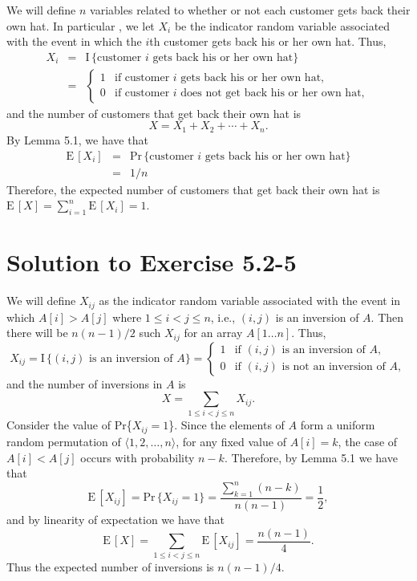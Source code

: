 \documentclass[a4paper, fleqn]{article}
\begin{document}
We will define $n$ variables related to whether or not each customer gets back
their own hat. In particular , we let $X_i$ be the indicator random variable
associated with the event in which the $i$th customer gets back his or her own
hat. Thus,
\begin{eqnarray*}
X_i & = & \mbox{I}\,\{\mbox{customer }i\mbox{ gets back his or her own hat}\} \\
    & = & \left\{\begin{array}{ll}
          1 & \mbox{if customer }i\mbox{ gets back his or her own hat}, \\
          0 & \mbox{if customer }i\mbox{ does not get back his or her own hat},
          \end{array}\right.
\end{eqnarray*}
and the number of customers that get back their own hat is
\[
X = X_1 + X_2 + \cdots + X_n.
\]
By Lemma 5.1, we have that
\begin{eqnarray*}
\mbox{E}\,[X_i] & = & \mbox{Pr}\,\{\mbox{customer } i
                      \mbox{ gets back his or her own hat}\} \\
                & = & 1/n
\end{eqnarray*}
Therefore, the expected number of customers that get back their own hat is
$\mbox{E}\,[X] = \sum_{i = 1}^n \mbox{E}\,[X_i] = 1$.






\section*{Solution to Exercise 5.2-5}

We will define $X_{ij}$ as the indicator random variable associated with the
event in which $A[i] > A[j]$ where $1 \le i < j \le n$, i.e., $(i,j)$ is an
inversion of $A$. Then there will be $n(n - 1)/2$ such $X_{ij}$ for an array
$A[1 \ldots n]$. Thus,
\[
X_{ij} = \mbox{I}\,\{(i,j) \mbox{ is an inversion of } A\} =
         \left\{\begin{array}{ll}
         1 & \mbox{if } (i,j) \mbox{ is an inversion of } A, \\
         0 & \mbox{if } (i,j) \mbox{ is not an inversion of } A,
         \end{array}\right.
\]
and the number of inversions in $A$ is
\[
X = \sum_{1 \le i < j \le n} X_{ij}.
\]
Consider the value of Pr\{$X_{ij} = 1$\}. Since the elements of $A$ form a
uniform random permutation of $\langle 1,2,\ldots,n \rangle$, for any fixed
value of $A[i] = k$, the case of $A[i] < A[j]$ occurs with probability $n - k$.
Therefore, by Lemma 5.1 we have that
\[
\mbox{E}\,[X_{ij}] = \mbox{Pr}\,\{X_{ij} = 1\} =
\frac{\sum_{k = 1}^n (n - k)}{n(n - 1)} = \frac{1}{2},
\]
and by linearity of expectation we have that
\[
\mbox{E}\,[X] = \sum_{1 \le i < j \le n} \mbox{E}\,[X_{ij}] = \frac{n(n - 1)}{4}.
\]
Thus the expected number of inversions is $n(n - 1)/4$.
\end{document}
